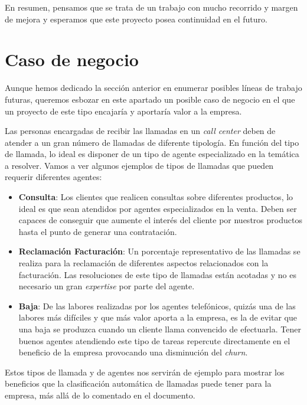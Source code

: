 En resumen, pensamos que se trata de un trabajo con mucho recorrido y margen de mejora y esperamos que este proyecto posea continuidad en el futuro.

\section{Caso de negocio}
\label{section:con:neg}

Aunque hemos dedicado la sección anterior en enumerar posibles líneas de trabajo futuras, queremos esbozar en este apartado un posible caso de negocio en el que un proyecto de este tipo encajaría y aportaría valor a la empresa. 

Las personas encargadas de recibir las llamadas en un \textit{call center} deben de atender a un gran número de llamadas de diferente tipología. En función del tipo de llamada, lo ideal es disponer de un tipo de agente especializado en la temática a resolver. Vamos a ver algunos ejemplos de tipos de llamadas que pueden requerir diferentes agentes:

\begin{itemize}
\item \textbf{Consulta}:  Los clientes que realicen consultas sobre diferentes productos, lo ideal es que sean atendidos por agentes especializados en la venta. Deben ser capaces de conseguir que aumente el interés del cliente por nuestros productos hasta el punto de generar una contratación. 

\item \textbf{Reclamación Facturación}: Un porcentaje representativo de las llamadas se realiza para la reclamación de diferentes aspectos relacionados con la facturación. Las resoluciones de este tipo de llamadas están acotadas y  no es necesario un gran \textit{expertise} por parte del agente. 

\item \textbf{Baja}: De las labores realizadas por los agentes telefónicos, quizás una de las labores más difíciles y que más valor aporta a la empresa, es la de evitar que una baja se produzca cuando un cliente llama convencido de efectuarla. Tener buenos agentes atendiendo este tipo de tareas repercute directamente en el beneficio de la empresa provocando una disminución del \textit{churn}.
\end{itemize}



Estos tipos de llamada y de agentes nos servirán de ejemplo para mostrar los beneficios que la clasificación automática de llamadas puede tener para la empresa, más allá de lo comentado en el documento.


